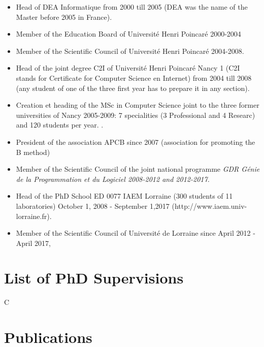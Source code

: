 \documentclass[ 12pt]{article}
\begin{document}
\begin{itemize}
  


\item Head of  DEA Informatique from  2000 till 2005 (DEA  was the name of the Master before 2005 in France).

\item Member of the Education Board of Universit\'e Henri Poincar\'e 2000-2004

\item Member of the Scientific Council of Universit\'e Henri Poincar\'e 2004-2008.


\item Head of  the joint degree  C2I of Universit\'e Henri Poincar\'e Nancy 1 (C2I stands  for Certificate for Computer Science en Internet)  from 2004 till 2008 (any student of one of the three first year has to prepare it in any  section). 

\item Creation et heading of the MSc in Computer Science joint to the three former  universities of Nancy  2005-2009: 7 specialities  (3 Professional  and 4 Researc) and  120 
students per year.
.

\item President of the association APCB since 2007 (association for promoting the B method)



\item  Member of the Scientific Council of the joint  national programme  \textit{GDR G\'enie de la Programmation et du Logiciel 2008-2012 and 2012-2017.}

\item Head of the PhD School ED 0077   IAEM Lorraine  (300 students of 11 laboratories)  October 1, 2008 - September 1,2017  (http://www.iaem.univ-lorraine.fr).

\item Member of the Scientific Council of Universit\'e de Lorraine  since  April  2012 - April 2017,

\end{itemize}



\section{List of PhD Supervisions}
\label{sec:list-phd-superv}


C
\section{Publications }
\label{sec:publications-}
\end{document}
